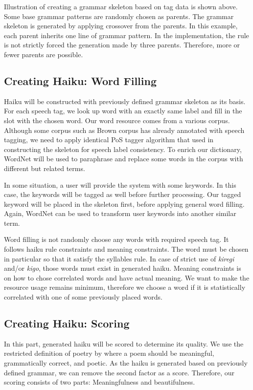 Illustration of creating a grammar skeleton based on tag data is shown above. Some base grammar patterns are randomly chosen as parents. The grammar skeleton is generated by applying crossover from the parents. In this example, each parent inherits one line of grammar pattern. In the implementation, the rule is not strictly forced the generation made by three parents. Therefore, more or fewer parents are possible.


\subsection{Creating Haiku: Word Filling}


Haiku will be constructed with previously defined grammar skeleton as its basis. For each speech tag, we look up word with an exactly same label and fill in the slot with the chosen word. Our word resource comes from a various corpus. Although some corpus such as Brown corpus has already annotated with speech tagging, we need to apply identical PoS tagger algorithm that used in constructing the skeleton for speech label consistency. To enrich our dictionary, WordNet will be used to paraphrase and replace some words in the corpus with different but related terms. 


In some situation, a user will provide the system with some keywords. In this case, the keywords will be tagged as well before further processing. Our tagged keyword will be placed in the skeleton first, before applying general word filling. Again, WordNet can be used to transform user keywords into another similar term.


Word filling is not randomly choose any words with required speech tag. It follows haiku rule constraints and meaning constraints. The word must be chosen in particular so that it satisfy the syllables rule. In case of strict use of \textit{kiregi} and/or \textit{kigo}, those words must exist in generated haiku. Meaning constraints is on how to chose correlated words and have actual meaning. We want to make the resource usage remains minimum, therefore we choose a word if it is statistically correlated with one of some previously placed words.



\subsection{Creating Haiku: Scoring}


In this part, generated haiku will be scored to determine its quality. We use the restricted definition of poetry by \citeauthor{manurung2004evolutionary} where a poem should be meaningful, grammatically correct, and poetic. As the haiku is generated based on previously defined grammar, we can remove the second factor as a score. Therefore, our scoring consists of two parts: Meaningfulness and beautifulness. 


